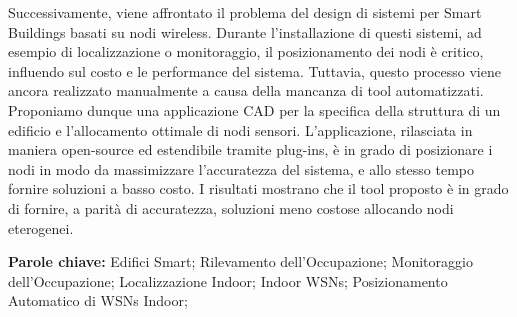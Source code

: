 Successivamente, viene affrontato il problema del design di sistemi per Smart Buildings basati su nodi wireless. Durante l'installazione di questi sistemi, ad esempio di localizzazione o monitoraggio, il posizionamento dei nodi è critico, influendo sul costo e le performance del sistema. Tuttavia, questo processo viene ancora realizzato manualmente a causa della mancanza di tool automatizzati.\\
Proponiamo dunque una applicazione CAD per la specifica della struttura di un edificio e l'allocamento ottimale di nodi sensori. L'applicazione, rilasciata in maniera open-source ed estendibile tramite plug-ins, è in grado di posizionare i nodi in modo da massimizzare l'accuratezza del sistema, e allo stesso tempo fornire soluzioni a basso costo.
I risultati mostrano che il tool proposto è in grado di fornire, a parità di accuratezza, soluzioni meno costose allocando nodi eterogenei.

\medskip
%
\noindent \textbf{Parole chiave:} 
Edifici Smart; Rilevamento dell'Occupazione; Monitoraggio dell'Occupazione; Localizzazione Indoor; Indoor WSNs; Posizionamento Automatico di WSNs Indoor;
%
%
%
\endgroup			
%
%
